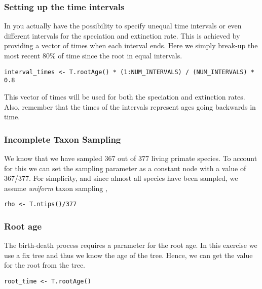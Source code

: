 \subsubsection{Setting up the time intervals}
In \RevBayes you actually have the possibility to specify unequal time intervals or even different intervals for the speciation and extinction rate.
This is achieved by providing a vector of times when each interval ends.
Here we simply break-up the most recent 80\% of time since the root in equal intervals.
{\tt \begin{snugshade*}
\begin{lstlisting}
interval_times <- T.rootAge() * (1:NUM_INTERVALS) / (NUM_INTERVALS) * 0.8
\end{lstlisting}
\end{snugshade*}}
This vector of times will be used for both the speciation and extinction rates.
Also, remember that the times of the intervals represent ages going backwards in time.

\subsubsection{Incomplete Taxon Sampling}

We know that we have sampled 367 out of 377 living primate species. 
To account for this we can set the sampling parameter as a constant node with a value of 367/377.
For simplicity, and since almost all species have been sampled, we assume \emph{uniform} taxon sampling \citep{Hoehna2011,Hoehna2014a},
{\tt \begin{snugshade*}
\begin{lstlisting}
rho <- T.ntips()/377
\end{lstlisting}
\end{snugshade*}}


\subsubsection{Root age}

The birth-death process requires a parameter for the root age.
In this exercise we use a fix tree and thus we know the age of the tree.
Hence, we can get the value for the root from the \citet{Springer2012} tree.
{\tt \begin{snugshade*}
\begin{lstlisting}
root_time <- T.rootAge()
\end{lstlisting}
\end{snugshade*}}

